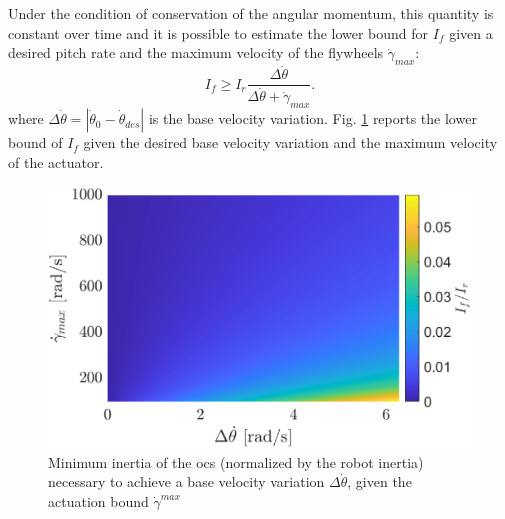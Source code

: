 \documentclass[letterpaper, 10 pt, conference]{ieeeconf}  %
\begin{document}
Under the condition of conservation of the angular momentum, this quantity is constant over time and it is possible to estimate the lower bound for $I_{f}$ given a desired pitch rate and the maximum velocity of the flywheels $\dot{\gamma}_{max}$:
\begin{equation}
I_{f} \geq I_r \dfrac{ \Delta \dot{\theta} }{\Delta \dot{\theta}+\dot{\gamma}_{max}}.
\end{equation}
where $\Delta \dot{\theta} =  \left\lvert \dot{\theta}_0-\dot{\theta}_{des} \right\rvert$ is the base velocity variation.
Fig. \ref{fig:inertia_limits} reports the lower bound of $I_{f}$ given the desired base velocity variation and the maximum velocity of the actuator.
\begin{figure}
	\centering
	\includegraphics[width=\linewidth]{figures/lowerbound.eps}
	\caption{\small Minimum inertia of the \gls{ocs} (normalized by the robot inertia) necessary to achieve a base velocity variation $\Delta \dot{\theta}$, given the actuation bound $\dot \gamma^{max}$}
	\label{fig:inertia_limits}
\end{figure}
\end{document}
